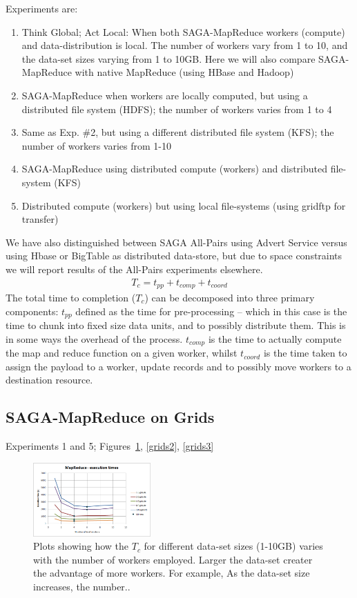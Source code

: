 \documentclass[conference,final]{IEEEtran}
\newcommand{\sagamapreduce }{SAGA-MapReduce }
\newcommand{\tc }{ $T_c$ }
\begin{document}
Experiments are:
\begin{enumerate}
\item Think Global; Act Local: When both \sagamapreduce workers
  (compute) and data-distribution is local. The number of workers vary
  from 1 to 10, and the data-set sizes varying from 1 to 10GB. Here we
  will also compare \sagamapreduce with native MapReduce (using HBase
  and Hadoop)
\item \sagamapreduce when workers are locally computed, but using a distributed file system (HDFS); the number of workers varies from 1 to 4
\item Same as Exp. \#2, but using a different distributed file system
  (KFS); the number of workers varies from 1-10
\item \sagamapreduce using distributed compute (workers) and distributed file-system (KFS)
\item Distributed compute (workers) but using local file-systems (using gridftp for transfer)
\end{enumerate}

We have also distinguished between SAGA All-Pairs using Advert Service
versus using Hbase or BigTable as distributed data-store, but due to
space constraints we will report results of the All-Pairs experiments
elsewhere.
\begin{eqnarray}
T_c = t_{pp} + t_{comp} + t_{coord}
\end{eqnarray}
The total time to completion ($T_c$) can be decomposed into three
primary components: $t_{pp}$ defined as the time for pre-processing --
which in this case is the time to chunk into fixed size data units,
and to possibly distribute them. This is in some ways the overhead of
the process.  $t_{comp}$ is the time to actually compute the map and
reduce function on a given worker, whilst $t_{coord}$ is the time
taken to assign the payload to a worker, update records and to
possibly move workers to a destination resource.



\subsection{SAGA-MapReduce on Grids}
Experiments 1 and 5;  Figures~\ref{grids1}, \ref{grids2}, \ref{grids3}
\begin{figure}[t]
  \includegraphics[width=0.4\textwidth]{MapReduce_local_executiontime.png}
\caption{Plots showing how the \tc for different data-set sizes
  (1-10GB) varies with the number of workers employed.
  Larger the data-set creater the advantage of more workers. For
  example, As the data-set size increases, the number..}
\label{grids1}
\end{figure}
\end{document}
